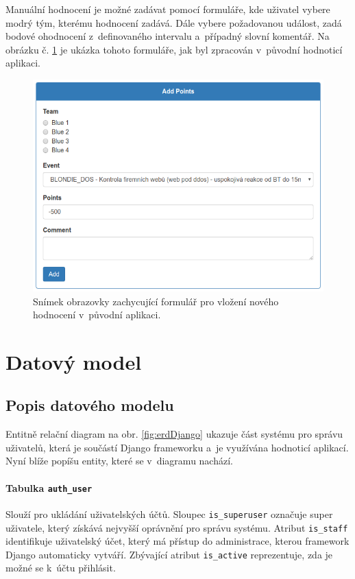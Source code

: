 \documentclass[
  digital,
  twoside,
  table, 
  nolof, 
  nolot
]{fithesis3}
\begin{document}
Manuální hodnocení je možné zadávat pomocí formuláře, kde uživatel vybere modrý tým, kterému hodnocení zadává. Dále vybere požadovanou událost, zadá bodové ohodnocení z~definovaného intervalu a~případný slovní komentář. Na obrázku č. \ref{fig:formScore} je ukázka tohoto formuláře, jak byl zpracován v~původní hodnoticí aplikaci.

\begin{figure}[h!]
    \centering
    \includegraphics[width=12.8cm]{images/form.png}
    \caption{Snímek obrazovky zachycující formulář pro vložení nového hodnocení v~původní aplikaci.}
    \label{fig:formScore}
\end{figure}

\section{Datový model}
\subsection{Popis datového modelu}

Entitně relační diagram na obr. \ref{fig:erdDjango} ukazuje část systému pro správu uživatelů, která je součástí Django frameworku a~je využívána hodnoticí aplikací. Nyní blíže popíšu entity, které se v~diagramu nachází.

\paragraph{Tabulka \texttt{auth\_user}} Slouží pro ukládání uživatelských účtů. Sloupec \texttt{is\_superuser} označuje super uživatele, který získává nejvyšší oprávnění pro správu systému. Atribut \texttt{is\_staff} identifikuje uživatelský účet, který má přístup do administrace, kterou framework Django automaticky vytváří. Zbývající atribut \texttt{is\_active} reprezentuje, zda je možné se k~účtu přihlásit.
\end{document}
